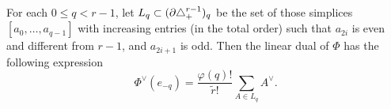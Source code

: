 \begin{remark}\label{remark:phidual}
	For each $0\leq q<r-1$, let $L_q \subset (\partial \triangle_{+}^{r-1})_q$ be the set of those simplices $[a_0,\dots, a_{q-1}]$ with increasing entries (in the total order) such that $a_{2i}$ is even and different from $r-1$, and $a_{2i+1}$ is odd. Then the linear dual of $\Phi$ has the following expression
	\begin{equation}\label{eq:111}
		\Phi^\vee(e_{-q}) = \frac{\varphi(q)!}{\tilde{r}!}\sum_{A\in L_q} A^\vee.
	\end{equation}
\end{remark}